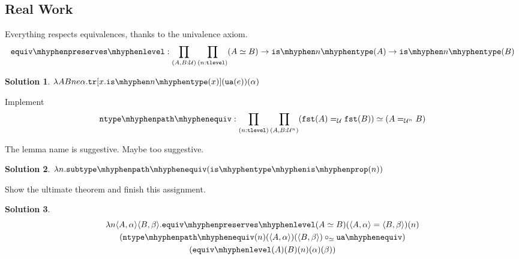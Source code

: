 \documentclass[12pt]{article}
\newcommand{\cut}[1]{}
\newcommand{\marksolution}[1]{\color{FireBrick}#1\normalcolor}%
\newcommand{\marksolution}[1]{\cut{#1}}%
\theoremstyle{plain}
\newtheorem*{solution}{Solution}
\begin{document}
\subsection{Real Work}

\begin{task}
  Everything respects equivalences, thanks to the univalence axiom.
  \[
    \equivpreserveslevel :
    \prod_{(A,B:\U)}
    \prod_{(n:\tlevel)}
    (A \eqv B) \to \istype{n}(A) \to \istype{n}(B)
  \]
\end{task}
\marksolution{
  \begin{solution}
    $
    \lambda A B n e\alpha . \tr[x.\istype{n}(x)](\ua(e))(\alpha)
    $
  \end{solution}
}


\begin{task} Implement
  \[
    \ntypepathequiv :
    \prod_{(n:\tlevel)}
    \prod_{(A,B:\U^n)}
    (\fst(A) =_\U \fst (B))
    \eqv
    (A =_{\U^n} B)
  \]
  \begin{hint}
    The lemma name is suggestive. Maybe too suggestive.
  \end{hint}
\end{task}
\marksolution{
  \begin{solution}
    $
    \lambda n. \subtypepatheqiv(\istypeisprop(n))
    $
  \end{solution}
}

\begin{task}
  Show the ultimate theorem and finish this assignment.
\end{task}
\marksolution{
  \begin{solution}
    \begin{multline*}
      \lambda n\pair{A}{\alpha}\pair{B}{\beta}.
      \equivpreserveslevel(A\eqv B)(\pair{A}{\alpha}=\pair{B}{\beta})(n)
      \\
      (\ntypepathequiv(n)(\pair{A}{\alpha})(\pair{B}{\beta}) \ecomp \uaequiv)
      \\
      (\equivlevel(A)(B)(n)(\alpha)(\beta))
    \end{multline*}
  \end{solution}
}
\end{document}
